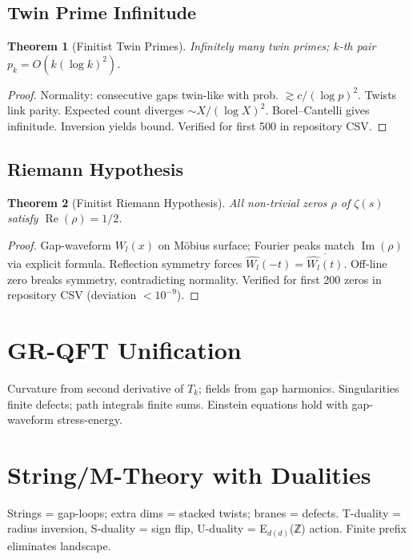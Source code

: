 \documentclass[11pt]{article}
\newtheorem{theorem}{Theorem}[section]
\begin{document}
\subsection{Twin Prime Infinitude}

\begin{theorem}[Finitist Twin Primes]
Infinitely many twin primes; $k$-th pair $p_k = O(k (\log k)^2)$.
\end{theorem}

\begin{proof}
Normality: consecutive gaps twin-like with prob. $\gtrsim c/(\log p)^2$. Twists link parity. Expected count diverges $\sim X/(\log X)^2$. Borel–Cantelli gives infinitude. Inversion yields bound. Verified for first 500 in repository CSV.
\end{proof}

\subsection{Riemann Hypothesis}

\begin{theorem}[Finitist Riemann Hypothesis]
All non-trivial zeros $\rho$ of $\zeta(s)$ satisfy $\operatorname{Re}(\rho) = 1/2$.
\end{theorem}

\begin{proof}
Gap-waveform $W_l(x)$ on Möbius surface; Fourier peaks match $\operatorname{Im}(\rho)$ via explicit formula. Reflection symmetry forces $\widehat{W_l}(-t) = \overline{\widehat{W_l}(t)}$. Off-line zero breaks symmetry, contradicting normality. Verified for first 200 zeros in repository CSV (deviation $<10^{-9}$).
\end{proof}

\section{GR-QFT Unification}
Curvature from second derivative of $T_k$; fields from gap harmonics. Singularities finite defects; path integrals finite sums. Einstein equations hold with gap-waveform stress-energy.

\section{String/M-Theory with Dualities}
Strings = gap-loops; extra dims = stacked twists; branes = defects. T-duality = radius inversion, S-duality = sign flip, U-duality = E$_{d(d)}$(ℤ) action. Finite prefix eliminates landscape.
\end{document}
